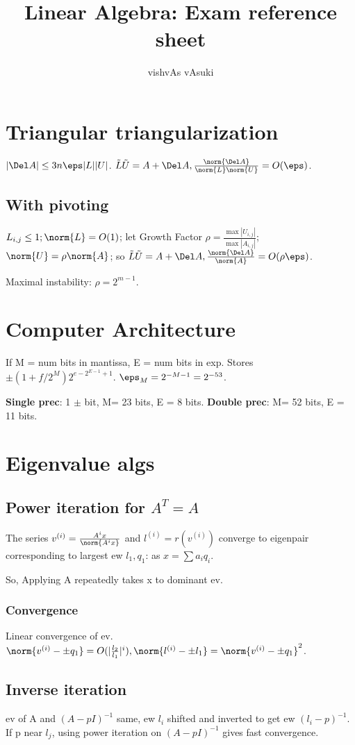 \documentclass[10pt]{amsart}
\title{Linear Algebra: Exam reference sheet}
\author{vishvAs vAsuki}
\begin{document}
\section{Triangular triangularization}
$|\Del A| \leq 3n\eps|L||U|$. \why $\tilde{L}\tilde{U} = A + \Del A, \frac{\norm{\Del A}}{\norm{L}\norm{U}} = O(\eps)$. \why

\subsection{With pivoting}
$L_{i,j} \leq 1; \norm{L} =O(1)$; let Growth Factor $\rho = \frac{\max |U_{i,j}|}{\max |A_{i,j}|}$; $\norm{U} = \rho \norm{A}$; so $\tilde{L}\tilde{U} = A + \Del A, \frac{\norm{\Del A}}{\norm{A}} = O(\rho \eps)$.

Maximal instability: $\rho = 2^{m-1}$.

\section{Computer Architecture}
If M = num bits in mantissa, E = num bits in exp. Stores $\pm (1+f/2^{M})2^{e - 2^{E-1} + 1}$. $\eps_{M} = 2^{-M -1} = 2^{-53}$.

\textbf{Single prec}: 1 $\pm$ bit, M= 23 bits, E = 8 bits. \textbf{Double prec}: M= 52 bits, E = 11 bits.

\section{Eigenvalue algs}
\subsection{Power iteration for $A^{T}=A$}
The series $v^{(i)} = \frac{A^{i}x}{\norm{A^{i}x}}$ and $l^{(i)} = r(v^{(i)})$ converge to eigenpair corresponding to largest ew $l_{1}, q_{1}$: as $x = \sum a_{i}q_{i}$.

So, Applying A repeatedly takes x to dominant ev.

\subsubsection{Convergence}
Linear convergence of ev. $\norm{v^{(i)} - \pm q_{1}} = O(|\frac{l_{2}}{l_{1}}|^{i}),\\
 \norm{l^{(i)} - \pm l_{1}} = \norm{v^{(i)} - \pm q_{1}}^{2}$.

\subsection{Inverse iteration}
ev of A and $(A-pI)^{-1}$ same, ew $l_{i}$ shifted and inverted to get ew $(l_{i} - p)^{-1}$. If p near $l_{j}$, using power iteration on $(A-pI)^{-1}$ gives fast convergence.
\end{document}
